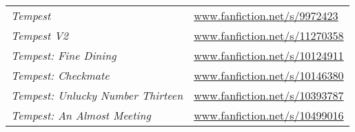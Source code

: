 {

\begin{tabularx}{\textwidth}{l X}
\textit{Tempest} & \href{https://www.fanfiction.net/s/9972423}{www.fanfiction.net/s/9972423}
\\
\textit{Tempest V2} & \href{https://www.fanfiction.net/s/11270358}{www.fanfiction.net/s/11270358}
\\
\textit{Tempest: Fine Dining} & \href{https://www.fanfiction.net/s/10124911}{www.fanfiction.net/s/10124911}
\\
\textit{Tempest: Checkmate} & \href{https://www.fanfiction.net/s/10146380}{www.fanfiction.net/s/10146380}
\\
\textit{Tempest: Unlucky Number Thirteen} & \href{https://www.fanfiction.net/s/10393787}{www.fanfiction.net/s/10393787}
\\
\textit{Tempest: An Almost Meeting} & \href{https://www.fanfiction.net/s/10499016}{www.fanfiction.net/s/10499016}
\\
\end{tabularx}

}